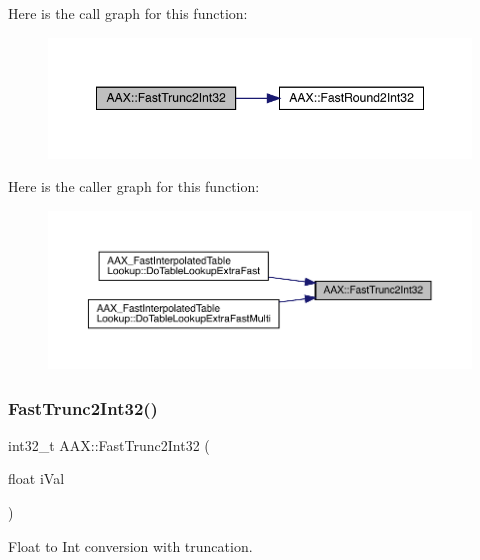 Here is the call graph for this function\+:
\nopagebreak
\begin{figure}[H]
\begin{center}
\leavevmode
\includegraphics[width=348pt]{a00852_ad2b2872b49146cf0859c403fea702a39_cgraph}
\end{center}
\end{figure}
Here is the caller graph for this function\+:
\nopagebreak
\begin{figure}[H]
\begin{center}
\leavevmode
\includegraphics[width=350pt]{a00852_ad2b2872b49146cf0859c403fea702a39_icgraph}
\end{center}
\end{figure}
\mbox{\label{a00852_a9a8bc8a47f13b4cb1bb84e45bf43fe82}} 
\subsubsection{\texorpdfstring{FastTrunc2Int32()}{FastTrunc2Int32()}\hspace{0.1cm}{\footnotesize\ttfamily [2/2]}}
{\footnotesize\ttfamily int32\+\_\+t A\+A\+X\+::\+Fast\+Trunc2\+Int32 (\begin{DoxyParamCaption}\item[{float}]{i\+Val }\end{DoxyParamCaption})\hspace{0.3cm}{\ttfamily [inline]}}



Float to Int conversion with truncation. 


